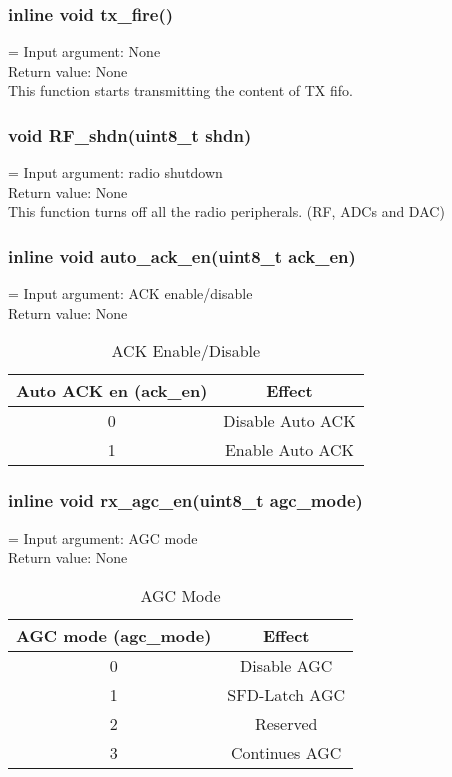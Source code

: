 \subsubsection{inline void tx\_fire()}
\hangindent=\parindent
{}
Input argument: None\\
Return value: None\\
This function starts transmitting the content of TX fifo.

\subsubsection{void RF\_shdn(uint8\_t shdn)}
\hangindent=\parindent
{}
Input argument: radio shutdown\\
Return value: None\\
This function turns off all the radio peripherals. (RF, ADCs and DAC)

\subsubsection{inline void auto\_ack\_en(uint8\_t ack\_en)}
\hangindent=\parindent
{}
Input argument: ACK enable/disable\\
Return value: None\\
\begin{table}[h]
\centering
	\begin{tabular}{|c|c|}
	\hline
		{\bf Auto ACK en (ack\_en)} & {\bf Effect}\\ \hline
		0 & Disable Auto ACK\\ \hline
		1 & Enable Auto ACK\\ \hline
	\end{tabular}
	\caption{ACK Enable/Disable}
\end{table}


\subsubsection{inline void rx\_agc\_en(uint8\_t agc\_mode)}
\hangindent=\parindent
{}
Input argument: AGC mode\\
Return value: None\\
\begin{table}[h]
\centering
	\begin{tabular}{|c|c|}
	\hline
		{\bf AGC mode (agc\_mode)} & {\bf Effect}\\ \hline
		0 & Disable AGC\\ \hline
		1 & SFD-Latch AGC\\ \hline
		2 & Reserved\\ \hline
		3 & Continues AGC\\ \hline
	\end{tabular}
	\caption{AGC Mode}
\end{table}

